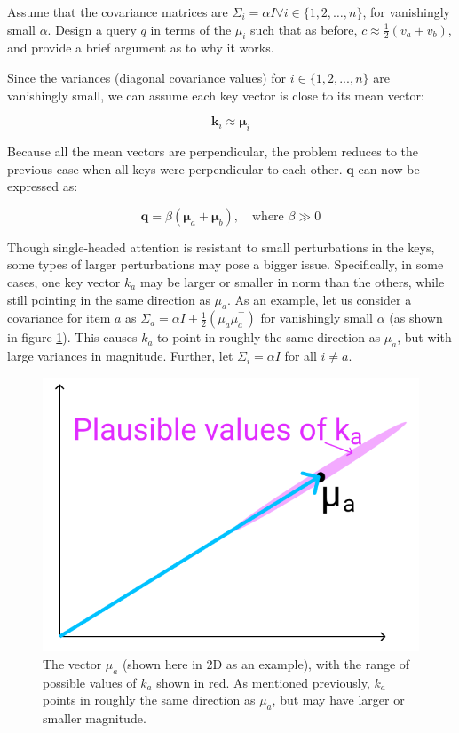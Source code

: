 \begin{parts}
\begin{subparts}
\subpart[2] Assume that the covariance matrices are $\Sigma_i = \alpha I \forall i \in \{1, 2, \ldots, n\}$, for vanishingly small $\alpha$.
Design a query $q$ in terms of the $\mu_i$ such that as before, $c\approx \frac{1}{2}(v_a + v_b)$, and provide a brief argument as to why it works.
\begin{answer}
        Since the variances (diagonal covariance values) for $i\in\{1,2,...,n\}$ are vanishingly small, we can assume each key vector is close to its mean vector:
        
        $$\mathbf{k}_i\approx\mathbf{\mu}_i$$
        
        Because all the mean vectors are perpendicular, the problem reduces to the previous case when all keys were perpendicular to each other. $\mathbf{q}$ can now be expressed as:
        
        $$\mathbf{q}=\beta(\mathbf{\mu}_a + \mathbf{\mu}_b),\quad\text{where } \beta \gg 0$$
\end{answer}

\subpart[3] Though single-headed attention is resistant to small perturbations in the keys, some types of larger perturbations may pose a bigger issue. Specifically, in some cases, one key vector $k_a$ may be larger or smaller in norm than the others, while still pointing in the same direction as $\mu_a$. As an example, let us consider a covariance for item $a$ as $\Sigma_a = \alpha I + \frac{1}{2}(\mu_a\mu_a^\top)$ for vanishingly small $\alpha$ (as shown in figure \ref{ka_plausible}). This causes $k_a$ to point in roughly the same direction as $\mu_a$, but with large variances in magnitude. Further, let $\Sigma_i = \alpha I$ for all $i \neq a$.
\begin{figure}[h]
\centering
\captionsetup{justification=centering,margin=2cm}
\includegraphics[width=0.35\linewidth]{images/ka_plausible.png}
\caption{The vector $\mu_a$ (shown here in 2D as an example), with the range of possible values of $k_a$ shown in red. As mentioned previously, $k_a$ points in roughly the same direction as $\mu_a$, but may have larger or smaller magnitude.}
\label{ka_plausible}
\end{figure}


\end{subparts}
\end{parts}
